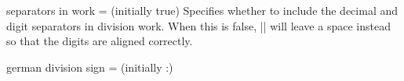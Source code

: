 \documentclass{ltxdoc}
\begin{document}
\begin{key}{separators in work =  (initially true)}
Specifies whether to include the decimal and digit separators in division work. When this is false, |\longdivision| will leave a space instead so that the digits are aligned correctly. \begin{tcblisting}{}
 \quad
{}
\end{tcblisting}
\end{key}

\begin{key}{german division sign =  (initially :)}
\begin{tcblisting}{}
 \quad
{}
\end{tcblisting}
\end{key}
\end{document}
